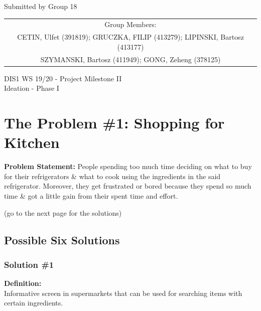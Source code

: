 \documentclass[a4paper,10pt,oneside]{scrreprt}
\begin{document}
\begin{center}
	Submitted by Group 18
	
	\bigskip
	
	\begin{tabular}{c}
	Group Members: \\
	CETIN, Ulfet (391819); GRUCZKA, FILIP (413279);	LIPINSKI, Bartosz (413177) \\
	SZYMANSKI, Bartosz (411949); GONG, Zeheng (378125)\\
	\end{tabular}

	\bigskip
	
	DIS1 WS 19/20 - Project Milestone II\\
	Ideation - Phase I\\
	
\end{center}
\vspace{-1cm}

\begingroup
\let\clearpage\relax
	\chapter{The Problem \#1: Shopping for Kitchen}
\endgroup
				\vspace{-0.5cm}
				\textbf{Problem Statement:} People spending too much time deciding on what to buy for their refrigerators \& what to cook using the ingredients in the said refrigerator. Moreover, they get frustrated or bored because they spend so much time \& got a little gain from their spent time and effort.\\
				
				\vspace{2cm}
				\begin{center}
					\centering
					(go to the next page for the solutions)
				\end{center}
				
				
	\clearpage
		
	\section{Possible Six Solutions}
	
		\subsection{Solution \#1}
		
			\textbf{Definition:}\\
			\indent Informative screen in supermarkets that can be used for searching items with certain ingredients.\\
			
\end{document}
